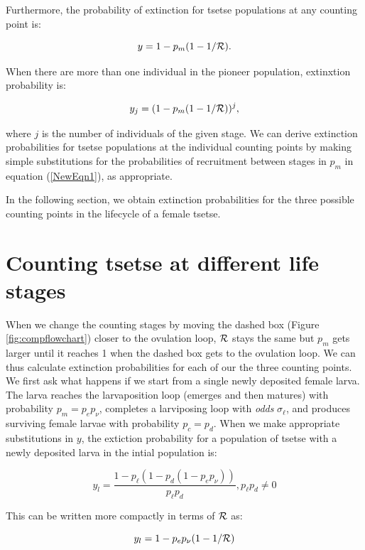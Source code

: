 \documentclass[smallextended]{svjour3}
\newcommand{\comment}[3]{\textcolor{#1}{\textbf{[#2: }\textit{#3}\textbf{]}}}
\newcommand{\jd}[1]{\comment{cyan}{JD}{#1}}
\begin{document}
Furthermore, the probability of extinction for tsetse populations at any counting point is:

\begin{equation}
	\label{NewEqn1}	
	y = 1 - p_m(1-1/{\cal R}).	
\end{equation}

When there are more than one individual in the pioneer population, extinxtion probability is:

$$y_j = (1 - p_m(1-1/{\cal R}))^j,$$

where $j$ is the number of individuals of the given stage. We can derive extinction probabilities for tsetse populations at the individual counting points by making simple substitutions for the probabilities of recruitment  between stages in $p_m$  in equation (\ref{NewEqn1}), as appropriate. 

In the following section, we obtain extinction probabilities  for the three possible counting points in the lifecycle of a female tsetse.

\section{Counting tsetse at different life stages}

When we change the counting stages by moving the dashed box (Figure \ref{fig:compflowchart}) closer to the ovulation loop, ${\cal R}$ stays the same but $p_m$ gets larger until it reaches 1 when the dashed box gets to the ovulation loop. We can thus calculate extinction probabilities for each of our the three counting points. We first ask what happens if we start from a single newly deposited female larva.
The larva reaches the larvaposition loop (emerges and then matures) with probability $p_m = p_e p_{\nu}$, completes a larviposing loop with \textit{odds} $\sigma_\ell$, and produces surviving female larvae with probability $p_c = p_d$. 
When we make appropriate substitutions in $y$, the extiction probability for a population of tsetse with a newly deposited larva in the intial population is:

$$y_l = \frac{1-p_{\ell}(1 - p_{d}(1 - p_{e}p_{\nu}))}{p_{\ell}p_{d}}, p_{\ell}p_{d} \neq 0$$


This can be written more compactly in terms of ${\cal R}$ as:

\begin{equation}
	\label{NewEqn2}
	y_l = 1 - p_ep_{\nu}(1-1/{\cal R})	
\end{equation}
\end{document}
